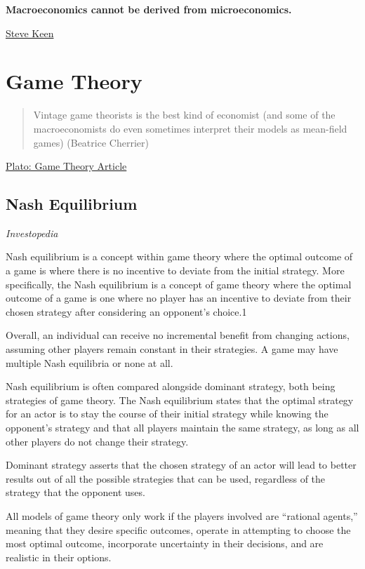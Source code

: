 \documentclass[
]{book}
\begin{document}
\textbf{Macroeconomics cannot be derived from microeconomics.}

\href{https://evonomics.com/why-economists-have-to-embrace-complexity-steve-keen/}{Steve Keen}

\hypertarget{game-theory}{%
\chapter{Game Theory}\label{game-theory}}

\begin{quote}
Vintage game theorists is the best kind of economist (and some of the macroeconomists do even sometimes interpret their models as mean-field games)
(Beatrice Cherrier)
\end{quote}

\href{https://plato.stanford.edu/entries/game-theory/}{Plato: Game Theory Article}

\hypertarget{nash-equilibrium}{%
\section{Nash Equilibrium}\label{nash-equilibrium}}

\emph{Investopedia}

Nash equilibrium is a concept within game theory where the optimal outcome of a game is where there is no incentive to deviate from the initial strategy. More specifically, the Nash equilibrium is a concept of game theory where the optimal outcome of a game is one where no player has an incentive to deviate from their chosen strategy after considering an opponent's choice.1

Overall, an individual can receive no incremental benefit from changing actions, assuming other players remain constant in their strategies. A game may have multiple Nash equilibria or none at all.

Nash equilibrium is often compared alongside dominant strategy, both being strategies of game theory. The Nash equilibrium states that the optimal strategy for an actor is to stay the course of their initial strategy while knowing the opponent's strategy and that all players maintain the same strategy, as long as all other players do not change their strategy.

Dominant strategy asserts that the chosen strategy of an actor will lead to better results out of all the possible strategies that can be used, regardless of the strategy that the opponent uses.

All models of game theory only work if the players involved are ``rational agents,'' meaning that they desire specific outcomes, operate in attempting to choose the most optimal outcome, incorporate uncertainty in their decisions, and are realistic in their options.
\end{document}
